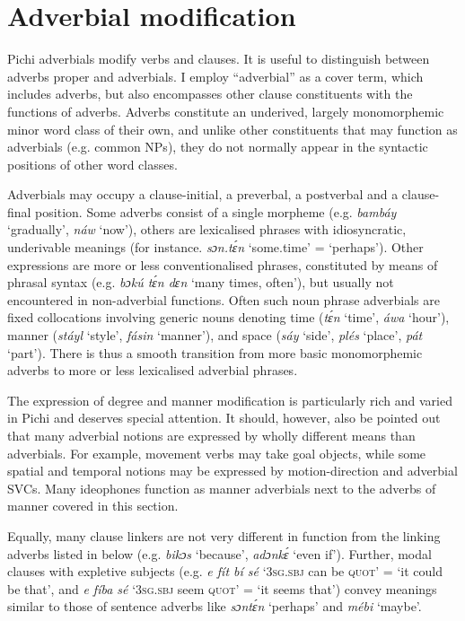 \section{Adverbial modification}\label{sec:7.7}

Pichi adverbials modify verbs and clauses. It is useful to distinguish between adverbs proper and adverbials. I employ “adverbial” as a cover term, which includes adverbs, but also encompasses other clause constituents with the functions of adverbs. Adverbs constitute an underived, largely monomorphemic minor word class of their own, and unlike other constituents that may function as adverbials (e.g. common NPs), they do not normally appear in the syntactic positions of other word classes. 


Adverbials may occupy a clause-initial, a preverbal, a postverbal and a clause-final position. Some adverbs consist of a single morpheme (e.g. \textit{bambáy} ‘gradually’, \textit{náw} ‘now’), others are lexicalised phrases with idiosyncratic, underivable meanings (for instance. \textit{sɔn.tɛ́n} ‘some.time’ = ‘perhaps’). Other expressions are more or less conventionalised phrases, constituted by means of phrasal syntax (e.g. \textit{bɔkú tɛ́n dɛn} ‘many times, often’), but usually not encountered in non-adverbial functions. Often such noun phrase adverbials are fixed collocations involving generic nouns denoting time (\textit{tɛ́n} ‘time’, \textit{áwa} ‘hour’), manner (\textit{stáyl} ‘style’, \textit{fásin} ‘manner’), and space (\textit{sáy} ‘side’, \textit{plés} ‘place’, \textit{pát} ‘part’). There is thus a smooth transition from more basic monomorphemic adverbs to more or less lexicalised adverbial phrases. 



The expression of degree and manner modification is particularly rich and varied in Pichi and deserves special attention. It should, however, also be pointed out that many adverbial notions are expressed by wholly different means than adverbials. For example, movement verbs may take goal objects, while some spatial and temporal notions may be expressed by motion-direction and adverbial SVCs. Many ideophones function as manner adverbials next to the adverbs of manner covered in this section. 



Equally, many clause linkers are not very different in function from the linking adverbs listed in  below (e.g. \textit{bikɔs} ‘because’, \textit{adɔnkɛ́} ‘even if’). Further, modal clauses with expletive subjects (e.g. \textit{e fít bí sé} ‘\textsc{3sg.sbj} can be \textsc{quot}’ = ‘it could be that’, and \textit{e fíba sé} ‘\textsc{3sg.sbj} seem \textsc{quot}’ = ‘it seems that’) convey meanings similar to those of sentence adverbs like \textit{sɔntɛ́n} ‘perhaps’ and \textit{mébi} ‘maybe’.


